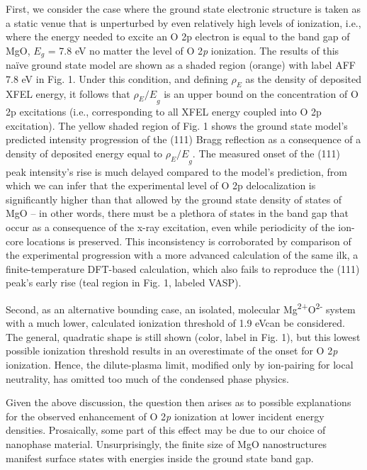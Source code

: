 First, we consider the case where the ground state electronic structure
is taken as a static venue that is unperturbed by even relatively high
levels of ionization, i.e., where the energy needed to excite an O 2p
electron is equal to the band gap of MgO, \(E_{g}\) = 7.8 eV no matter
the level of O 2\emph{p} ionization. The results of this naïve ground
state model are shown as a shaded region (orange) with label AFF 7.8 eV
in Fig. 1. Under this condition, and defining \(\rho_{E}\) as the
density of deposited XFEL energy, it follows that \({\rho_{E}/E}_{g}\)
is an upper bound on the concentration of O 2p excitations (i.e.,
corresponding to all XFEL energy coupled into O 2p excitation). The
yellow shaded region of Fig. 1 shows the ground state model's predicted
intensity progression of the (111) Bragg reflection as a consequence of
a density of deposited energy equal to \({\rho_{E}/E}_{g}.\) The
measured onset of the (111) peak intensity's rise is much delayed
compared to the model's prediction, from which we can infer that the
experimental level of O 2p delocalization is significantly higher than
that allowed by the ground state density of states of MgO -- in other
words, there must be a plethora of states in the band gap that occur as
a consequence of the x-ray excitation, even while periodicity of the
ion-core locations is preserved. This inconsistency is corroborated by
comparison of the experimental progression with a more advanced
calculation of the same ilk, a finite-temperature DFT-based calculation,
which also fails to reproduce the (111) peak's early rise (teal region
in Fig. 1, labeled VASP).

Second, as an alternative bounding case, an isolated, molecular
Mg\textsuperscript{2+}O\textsuperscript{2-} system with a much lower,
calculated ionization threshold of 1.9 eVcan be considered. The general,
quadratic shape is still shown (color, label in Fig. 1), but this lowest
possible ionization threshold results in an overestimate of the onset
for O 2\emph{p} ionization. Hence, the dilute-plasma limit, modified
only by ion-pairing for local neutrality, has omitted too much of the
condensed phase physics.

Given the above discussion, the question then arises as to possible
explanations for the observed enhancement of O 2\emph{p} ionization at
lower incident energy densities. Prosaically, some part of this effect
may be due to our choice of nanophase material. Unsurprisingly, the
finite size of MgO nanostructures manifest surface states with energies
inside the ground state band gap. 

